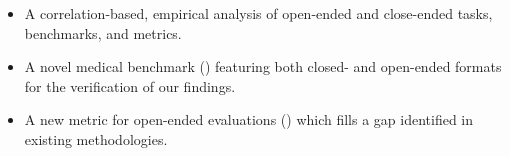 \begin{itemize}
    \item A correlation-based, empirical analysis of open-ended and close-ended tasks, benchmarks, and metrics.
    \item A novel medical benchmark (\careqa{}) featuring both closed- and open-ended formats for the verification of our findings.
    \item A new metric for open-ended evaluations (\relaxed{}) which fills a gap identified in existing methodologies.
\end{itemize}






